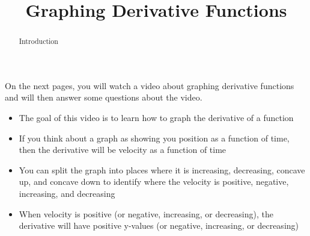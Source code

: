 \documentclass[handout]{ximera}
\title{Graphing Derivative Functions}
\begin{document}
\begin{abstract} Introduction %
\end{abstract}

\maketitle

On the next pages, you will watch a video about graphing derivative functions and will then answer some questions about the video.

\begin{itemize}
\item The goal of this video is to learn how to graph the derivative of a function
\item If you think about a graph as showing you position as a function of time, then the derivative will be velocity as a function of time
\item You can split the graph into places where it is increasing, decreasing, concave up, and concave down to identify where the velocity is positive, negative, increasing, and decreasing
\item When velocity is positive (or negative, increasing, or decreasing), the derivative will have positive y-values (or negative, increasing, or decreasing)
\end{itemize}
\end{document}
